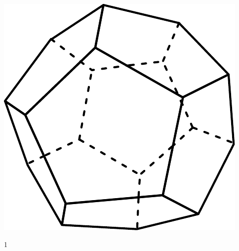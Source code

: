 \documentclass[a4paper,11pt]{report}
\begin{document}
\begin{exop}
{\begin{tasks}[after-item-skip = 0.4em]
	\includegraphics[scale=0.4]{media/es-21/tp5}
\end{tasks}
	}{1}
\end{exop}
\end{document}

